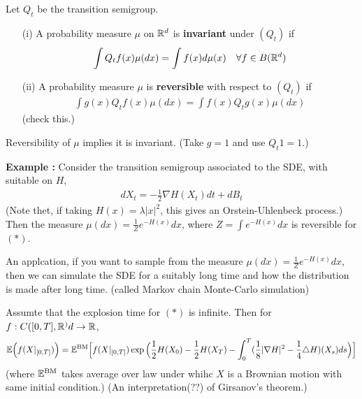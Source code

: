 \documentclass[12pt,a4paper]{article}
\begin{document}
 Let $Q_t$ be the transition semigroup.
\begin{itemize}
\item[(i)] A probability measure $\mu$ on $\mathbb{R}^d$ is \textbf{invariant} under $(Q_t)$ if
\begin{align*}
\int Q_t f(x) \mu(dx) = \int f(x) d\mu(x) \quad \forall f\in B(\mathbb{R}^d)
\end{align*} 
\item[(ii)] A probability measure $\mu$ is \textbf{reversible} with respect to $(Q_t)$ if
\begin{align*}
\int g(x) Q_t f(x) \mu(dx) = \int f(x) Q_t g(x) \mu(dx)
\end{align*}
(check this.) 
\end{itemize}
\s

\fact Reversibility of $\mu$ implies it is invariant. (Take $g=1$ and use $Q_t 1=1$.)
\s

\textbf{Example :} Consider the transition semigroup associated to the SDE, with suitable on $H$,
\begin{align*}
dX_t = -\frac{1}{2}\nabla H(X_t) dt + dB_t
\end{align*}
(Note thet, if taking $H(x)=\lambda |x|^2$, this gives an Orstein-Uhlenbeck process.) Then the measure $\mu(dx) = \frac{1}{Z} e^{-H(x)}dx$, where $Z= \int e^{-H(x)}dx$ is reversible for $(*)$.

\quad An applcation, if you want to sample from the measure $\mu(dx) = \frac{1}{Z} e^{-H(x)}dx$, then we can simulate the SDE for a suitably long time and how the distribution is made after long time. (called Markov chain Monte-Carlo simulation)
\s

\lem Assumte that the explosion time for $(*)$ is infinite. Then for $f: C([0, T], \mathbb{R}^)d\rightarrow \mathbb{R}$,
\begin{align*}
\mathbb{E} \Big( f(X|_{[0, T]}) \Big) = \mathbb{E}^{\text{BM}} \Big[ f(X|_{[0,T]}) \exp \Big( \frac{1}{2} H(X_0) - \frac{1}{2} H(X_T) - \int_0^T (\frac{1}{8} |\nabla H|^2 - \frac{1}{4} \triangle H) (X_s) ds \Big) \Big]
\end{align*}
(where $\mathbb{E}^{\text{BM}}$ takes average over law under whihc $X$ is a Brownian motion with same initial condition.)
(An interpretation(??) of Girsanov's theorem.)
\end{document}
